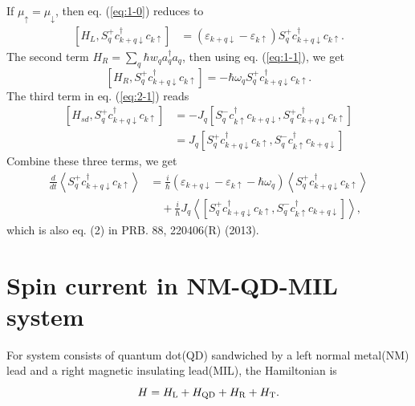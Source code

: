 \documentclass[11pt,a4paper]{article}
\begin{document}
If $\mu_{\uparrow} = \mu_{\downarrow}$, then eq. (\ref{eq:1-0}) reduces to
\begin{equation}
\begin{split}
\left[H_{L}, S_{q}^{+} c_{k+q \downarrow}^{\dagger} c_{k \uparrow}\right] &= \left(\varepsilon_{k+q \downarrow}-\varepsilon_{k \uparrow}\right)S_{q}^{+} c_{k+q \downarrow}^{\dagger} c_{k \uparrow}.
\end{split}
\label{eq:1-01}
\end{equation}
The second term $H_{R} = \sum_{q} \hbar w_{q} a_{q}^{\dagger} a_{q}$, then using eq. (\ref{eq:1-1}), we get
\begin{equation}
\left[H_{R}, S_{q}^{+} c_{k+q \downarrow}^{\dagger} c_{k \uparrow}\right] = -\hbar \omega_{q}S_{q}^{+} c_{k+q \downarrow}^{\dagger} c_{k \uparrow}.
\end{equation}
The third term in eq. (\ref{eq:2-1}) reads
\begin{equation}
\begin{split}
\left[H_{sd}, S_{q}^{+} c_{k+q \downarrow}^{\dagger} c_{k \uparrow}\right] &= - J_{q} \left[S_{q}^{-} c_{k \uparrow}^{\dagger} c_{k+q \downarrow}, S_{q}^{+} c_{k+q \downarrow}^{\dagger} c_{k \uparrow}\right] \\
&= J_{q} \left[S_{q}^{+} c_{k+q \downarrow}^{\dagger} c_{k \uparrow}, S_{q}^{-} c_{k \uparrow}^{\dagger} c_{k+q \downarrow}\right]
\end{split}
\end{equation}
Combine these three terms, we get
\begin{equation}
\begin{split}
\frac{d}{d t}\left\langle S_{q}^{+} c_{k+q \downarrow}^{\dagger} c_{k \uparrow}\right\rangle&=\frac{i}{\hbar}\left(\varepsilon_{k+q \downarrow}-\varepsilon_{k \uparrow}-\hbar \omega_{q}\right)\left\langle S_{q}^{+} c_{k+q \downarrow}^{\dagger} c_{k \uparrow}\right\rangle\\ 
&\quad + \frac{i}{\hbar} J_{q}\left\langle\left[S_{q}^{+} c_{k+q \downarrow}^{\dagger} c_{k \uparrow}, S_{q}^{-} c_{k \uparrow}^{\dagger} c_{k+q \downarrow}\right]\right\rangle,
\end{split}
\end{equation}
which is also eq. (2) in PRB. 88, 220406(R) (2013).

\section{Spin current in NM-QD-MIL system}
For system consists of quantum dot(QD) sandwiched by a left normal metal(NM) lead and a right magnetic insulating lead(MIL), the Hamiltonian is
\begin{equation}
H=H_{\rm{L}}+H_{\rm{QD}}+H_{\rm{R}}+H_{\rm{T}}.
\end{equation}
\end{document}
